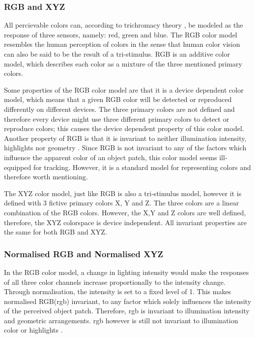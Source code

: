 \documentclass[a4paper,11pt]{article}
\begin{document}
\subsubsection{RGB and XYZ}

All percievable colors can, according to trichromacy theory \cite{gevers_color}, be modeled as the response of three sensors, namely: red, green and blue. The RGB color model resembles the human perception of colors in the sense that human color vision can also be said to be the result of a tri-stimulus.  RGB is an additive color model, which describes each color as a mixture of the three mentioned primary colors.

Some properties of the RGB color model are that it is a device dependent color model, which means that a given RGB color will be detected or reproduced differently on different devices. The three primary colors are not defined and therefore every device might use three different primary colors to detect or reproduce colors; this causes the device dependent property of this color model. Another property of RGB is that it is invariant to neither illumination intensity, highlights nor geometry \cite{gevers_invariant}. Since RGB is not invariant to any of the factors which influence the apparent color of an object patch, this color model seems ill-equipped for tracking. However, it is a standard model for representing colors and therefore worth mentioning.

The XYZ color model, just like RGB is also a tri-stimulus model, however it is defined  with 3 fictive primary colors X, Y and Z. The three colors are a linear combination of the RGB colors. However, the X,Y and Z colors are well defined, therefore, the XYZ colorspace is device independent. All invariant properties are the same for both RGB and XYZ.

\subsubsection{Normalised RGB and Normalised XYZ}

In the RGB color model, a change in lighting intensity would make the responses of all three color channels increase proportionally to the intensity change. Through normalisation, the intensity is set to a fixed level of 1. This makes normalised RGB(rgb) invariant, to any factor which solely influences the intensity of the perceived object patch. Therefore, rgb is invariant to illumination intensity and geometric arrangements. rgb however is still not invariant to illumination color or highlights \cite{gevers_invariant}. 
\end{document}
